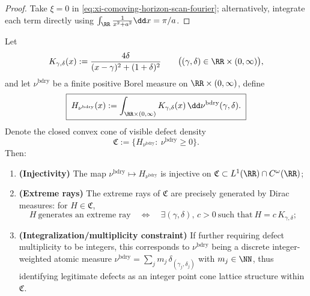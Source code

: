 \begin{proof}
Take \(\xi=0\) in \eqref{eq:xi-comoving-horizon-scan-fourier}; alternatively, integrate each term directly using
\(\int_{\RR}\frac{1}{x^2+a^2}\dd x=\pi/a\).
\end{proof}

\begin{proposition}\label{prop:xi-defect-density-cone-choquet-extreme}
Let
\[
K_{\gamma,\delta}(x):=\frac{4\delta}{(x-\gamma)^2+(1+\delta)^2}\qquad\bigl((\gamma,\delta)\in\RR\times(0,\infty)\bigr),
\]
and let \(\nu^{\mathrm{bdry}}\) be a finite positive Borel measure on \(\RR\times(0,\infty)\), define
\begin{equation}\label{eq:xi-defect-density-Hnu}
\boxed{\;
H_{\nu^{\mathrm{bdry}}}(x):=\int_{\RR\times(0,\infty)}K_{\gamma,\delta}(x)\,\dd\nu^{\mathrm{bdry}}(\gamma,\delta).\;}
\end{equation}
Denote the closed convex cone of visible defect density
\[
\mathfrak{C}:=\{H_{\nu^{\mathrm{bdry}}}:\ \nu^{\mathrm{bdry}}\ge 0\}.
\]
Then:
\begin{enumerate}
  \item \textbf{(Injectivity)} The map \(\nu^{\mathrm{bdry}}\mapsto H_{\nu^{\mathrm{bdry}}}\) is injective on \(\mathfrak{C}\subset L^1(\RR)\cap C^{\omega}(\RR)\);
  \item \textbf{(Extreme rays)} The extreme rays of \(\mathfrak{C}\) are precisely generated by Dirac measures: for \(H\in\mathfrak{C}\),
  \[
  H\ \text{generates an extreme ray}
  \quad\Longleftrightarrow\quad
  \exists(\gamma,\delta),\,c>0\ \text{such that}\ H=c\,K_{\gamma,\delta};
  \]
  \item \textbf{(Integralization/multiplicity constraint)} If further requiring defect multiplicity to be integers, this corresponds to \(\nu^{\mathrm{bdry}}\) being a discrete integer-weighted atomic measure
  \(
  \nu^{\mathrm{bdry}}=\sum_j m_j\,\delta_{(\gamma_j,\delta_j)}
  \)
  with \(m_j\in\NN\), thus identifying legitimate defects as an integer point cone lattice structure within \(\mathfrak{C}\).
\end{enumerate}
\end{proposition}

